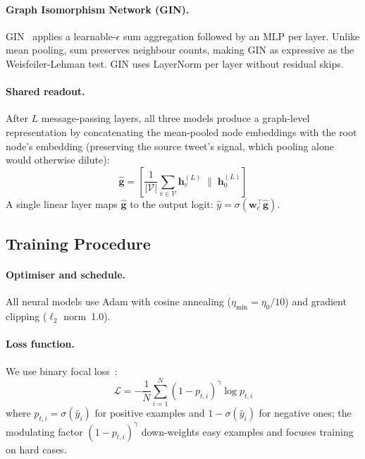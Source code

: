 \documentclass[runningheads]{llncs}
\begin{document}
\paragraph{Graph Isomorphism Network (GIN).}
GIN~\cite{xu2019powerful} applies a learnable-$\epsilon$ sum aggregation
followed by an MLP per layer. Unlike mean pooling, sum preserves neighbour
counts, making GIN as expressive as the Weisfeiler-Lehman test. GIN uses
LayerNorm per layer without residual skips.

\paragraph{Shared readout.}
After $L$ message-passing layers, all three models produce a graph-level
representation by concatenating the mean-pooled node embeddings with the root
node's embedding (preserving the source tweet's signal, which pooling alone
would otherwise dilute):
%
\begin{equation}
  \hat{\mathbf{g}} =
    \left[
      \frac{1}{|\mathcal{V}|} \sum_{v \in \mathcal{V}} \mathbf{h}_v^{(L)}
      \;\Big\|\;
      \mathbf{h}_0^{(L)}
    \right]
\end{equation}
%
A single linear layer maps $\hat{\mathbf{g}}$ to the output logit:
$\hat{y} = \sigma(\mathbf{w}_c^\top \hat{\mathbf{g}})$.


\subsection{Training Procedure}

\paragraph{Optimiser and schedule.}
All neural models use Adam with cosine annealing ($\eta_{\min} = \eta_0 / 10$)
and gradient clipping ($\ell_2$ norm~1.0).

\paragraph{Loss function.}
We use binary focal loss~\cite{lin2017focal}:
%
\begin{equation}
  \mathcal{L} = -\frac{1}{N}\sum_{i=1}^{N}
    (1 - p_{t,i})^\gamma \log p_{t,i}
\end{equation}
%
where $p_{t,i} = \sigma(\hat{y}_i)$ for positive examples and
$1 - \sigma(\hat{y}_i)$ for negative ones; the modulating factor
$(1-p_{t,i})^\gamma$ down-weights easy examples and focuses training on hard
cases.
\end{document}
